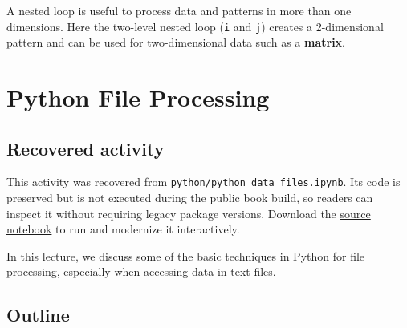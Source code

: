 \documentclass[
  letterpaper,
]{scrbook}
\begin{document}
A nested loop is useful to process data and patterns in more than one
dimensions. Here the two-level nested loop (\texttt{i} and \texttt{j})
creates a 2-dimensional pattern and can be used for two-dimensional data
such as a \textbf{matrix}.

\chapter*{Python File Processing}\label{ch-lab-python-file-processing}


\section*{Recovered activity}\label{sec-lab-python-file-processing}


\begin{tcolorbox}[enhanced jigsaw, arc=.35mm, bottomrule=.15mm, bottomtitle=1mm, breakable, colback=white, colbacktitle=quarto-callout-note-color!10!white, colframe=quarto-callout-note-color-frame, coltitle=black, left=2mm, leftrule=.75mm, opacityback=0, opacitybacktitle=0.6, rightrule=.15mm, title=\textcolor{quarto-callout-note-color}{\faInfo}\hspace{0.5em}{Historical source and execution note}, titlerule=0mm, toprule=.15mm, toptitle=1mm]

This activity was recovered from
\texttt{python/python\_data\_files.ipynb}. Its code is preserved but is
not executed during the public book build, so readers can inspect it
without requiring legacy package versions. Download the
\href{../notebooks/python-file-processing.ipynb}{source notebook} to run
and modernize it interactively.

\end{tcolorbox}

In this lecture, we discuss some of the basic techniques in Python for
file processing, especially when accessing data in text files.

\section*{Outline}\label{outline}

\end{document}
